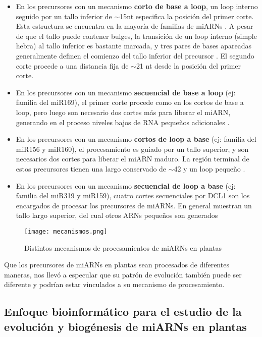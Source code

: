 \begin{itemize}
    \item En los precursores con un mecanismo \textbf{corto de base a loop}, un loop interno seguido por un tallo inferior de $\sim$15nt especifica la posición del primer corte.
        Esta estructura se encuentra en la mayoría de familias de miARNs \citep{Mateos2010,pmid20015653,pmid20015654}.
        A pesar de que el tallo puede contener bulges, la transición de un loop interno (simple hebra) al tallo inferior es bastante marcada, y tres pares de bases apareadas generalmente definen el comienzo del tallo inferior del precursor \citep{Bologna2013}.
        El segundo corte procede a una distancia fija de $\sim$21 nt desde la posición del primer corte.
    \item En los precursores con un mecanismo \textbf{secuencial de base a loop} (ej: familia del miR169), el primer corte procede como en los cortos de base a loop, pero luego son necesario dos cortes más para liberar el miARN, generando en el proceso niveles bajos de RNA pequeños adicionales \citep{Bologna2013}.
    \item En los precursores con un mecanismo \textbf{cortos de loop a base} (ej: familia del miR156 y miR160), el procesamiento es guiado por un tallo superior, y son necesarios dos cortes para liberar el miARN maduro.
        La región terminal de estos precursores tienen una largo conservado de $\sim$42 y un loop pequeño \citep{Bologna2013}.
    \item En los precursores con un mecanismo \textbf{secuencial de loop a base} (ej: familia del miR319 y miR159), cuatro cortes secuenciales por DCL1 son los encargados de procesar los precursores de miARNs.
        En general muestran un tallo largo superior, del cual otros ARNs pequeños son generados \citep{pmid19850910,Bologna2009,Bologna2013}
\end{itemize}

\begin{figure}[htbp!] 
    \centering    
    \texttt{[image: mecanismos.png]}
    \caption[Mecanismos de procesamiento]{Distintos mecanismos de procesamientos de miARNs en plantas}
    \label{fig:mecanismos}
\end{figure}


Que los precursores de miARNs en plantas sean procesados de diferentes maneras, nos llevó a especular que su patrón de evolución también puede ser diferente y podrían estar vinculados a su mecanismo de procesamiento.


\subsection{Enfoque bioinformático para el estudio de la evolución y biogénesis de miARNs en plantas}



